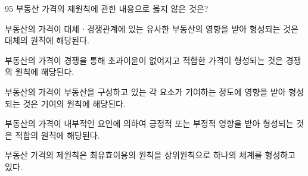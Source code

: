\begin{question}{95}
부동산 가격의 제원칙에 관한 내용으로 옳지 않은 것은?
\begin{choices}
  \item 부동산의 가격이 대체ㆍ경쟁관계에 있는 유사한 부동산의 영향을 받아 형성되는 것은 대체의 원칙에 해당된다.
  \item 부동산의 가격이 경쟁을 통해 초과이윤이 없어지고 적합한 가격이 형성되는 것은 경쟁의 원칙에 해당된다.
  \item 부동산의 가격이 부동산을 구성하고 있는 각 요소가 기여하는 정도에 영향을 받아 형성되는 것은 기여의 원칙에 해당된다.
  \item 부동산의 가격이 내부적인 요인에 의하여 긍정적 또는 부정적 영향을 받아 형성되는 것은 적합의 원칙에 해당된다.
  \item 부동산 가격의 제원칙은 최유효이용의 원칙을 상위원칙으로 하나의 체계를 형성하고 있다.
\end{choices}
\end{question}
